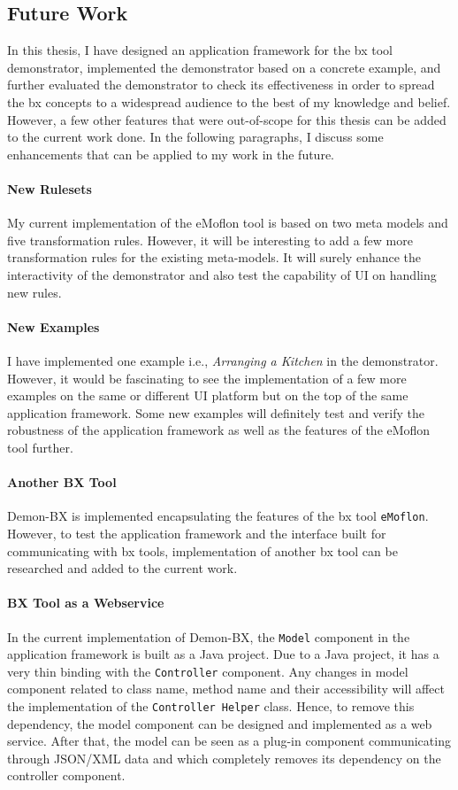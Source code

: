 \subsection{Future Work}\label{subsec:futurework}
In this thesis, I have designed an application framework for the bx tool demonstrator, implemented the demonstrator based on a concrete example, and further evaluated the demonstrator to check its effectiveness in order to spread the bx concepts to a widespread audience to the best of my knowledge and belief. However, a few other features that were out-of-scope for this thesis can be added to the current work done. In the following paragraphs, I discuss some enhancements that can be applied to my work in the future. 
\paragraph{New Rulesets}
My current implementation of the eMoflon tool is based on two meta models and five transformation rules. However, it will be interesting to add a few more transformation rules for the existing meta-models. It will surely enhance the interactivity of the demonstrator and also test the capability of UI on handling new rules.

\paragraph{New Examples} I have implemented one example i.e., \textit{Arranging a Kitchen} in the demonstrator. However, it would be fascinating to see the implementation of a few more examples on the same or different UI platform but on the top of the same application framework. Some new examples will definitely test and verify the robustness of the application framework as well as the features of the eMoflon tool further.

\paragraph{Another BX Tool}
Demon-BX is implemented encapsulating the features of the bx tool \texttt{eMoflon}. However, to test the application framework and the interface built for communicating with bx tools, implementation of another bx tool can be researched and added to the current work. 

\paragraph{BX Tool as a Webservice}
In the current implementation of Demon-BX, the \texttt{Model} component in the application framework is built as a Java project. Due to a Java project, it has a very thin binding with the \texttt{Controller} component. Any changes in model component related to class name, method name and their accessibility will affect the implementation of the \texttt{Controller Helper} class. Hence, to remove this dependency, the model component can be designed and implemented as a web service. After that, the model can be seen as a plug-in component communicating through JSON/XML data and which completely removes its dependency on the controller component. 

